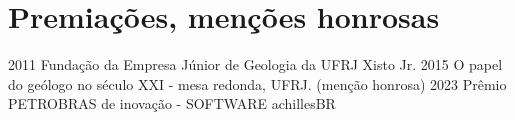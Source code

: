 \documentclass[letterpaper]{twentyonesecondcv} %
\begin{document}
{    \section{Premiações, menções honrosas}
    
    \begin{twentyshort}
      \twentyitemshort
        {2011}
        {Fundação da Empresa Júnior de Geologia da UFRJ Xisto Jr.}
      \twentyitemshort
        {2015}
	    {O papel do geólogo no século XXI - mesa redonda, UFRJ. (menção honrosa)}
      \twentyitemshort
	    {2023}
	    {Prêmio PETROBRAS de inovação - SOFTWARE achillesBR}

    \end{twentyshort}

}



\clearpage  %
\end{document}
